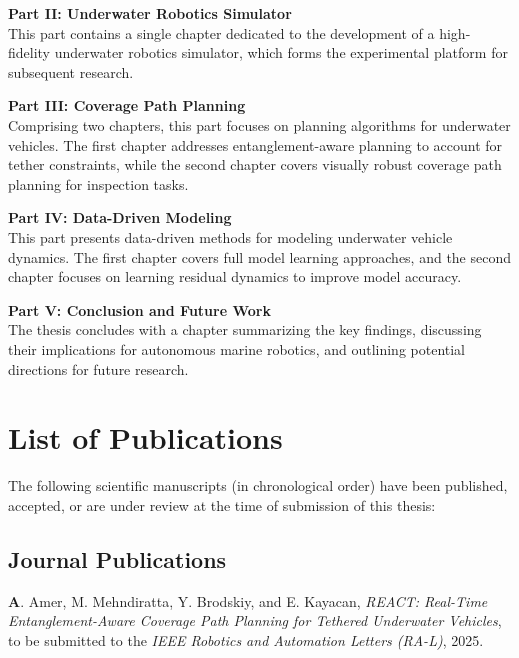\noindent  \textbf{Part II: Underwater Robotics Simulator} \\
This part contains a single chapter dedicated to the development of a high-fidelity underwater robotics simulator, which forms the experimental platform for subsequent research.

\noindent \textbf{Part III: Coverage Path Planning} \\
Comprising two chapters, this part focuses on planning algorithms for underwater vehicles. The first chapter addresses entanglement-aware planning to account for tether constraints, while the second chapter covers visually robust coverage path planning for inspection tasks.

\noindent \textbf{Part IV: Data-Driven Modeling} \\
This part presents data-driven methods for modeling underwater vehicle dynamics. The first chapter covers full model learning approaches, and the second chapter focuses on learning residual dynamics to improve model accuracy.

\noindent \textbf{Part V: Conclusion and Future Work} \\
The thesis concludes with a chapter summarizing the key findings, discussing their implications for autonomous marine robotics, and outlining potential directions for future research.


\section*{List of Publications}

The following scientific manuscripts (in chronological order) have been published, accepted, or are under review at the time of submission of this thesis:


\subsection*{Journal Publications}

\textbf A. Amer, M. Mehndiratta, Y. Brodskiy, and E. Kayacan,
\textit{REACT: Real-Time Entanglement-Aware Coverage Path Planning for Tethered Underwater Vehicles},
to be submitted to the \textit{IEEE Robotics and Automation Letters (RA-L)}, 2025.

\vspace{0.8em}

